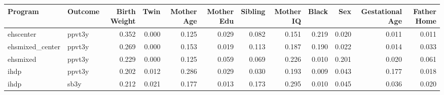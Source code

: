 \begin{table}[ht]
\centering
\begin{tabular}{llrrrrrrrrrr}
  \hline
Program & Outcome & Birth Weight & Twin & Mother Age & Mother Edu & Sibling & Mother IQ & Black & Sex & Gestational Age & Father Home \\ 
  \hline
ehscenter & ppvt3y & 0.352 & 0.000 & 0.125 & 0.029 & 0.082 & 0.151 & 0.219 & 0.020 & 0.011 & 0.011 \\ 
  ehsmixed\_center & ppvt3y & 0.269 & 0.000 & 0.153 & 0.019 & 0.113 & 0.187 & 0.190 & 0.022 & 0.014 & 0.033 \\ 
  ehsmixed & ppvt3y & 0.229 & 0.000 & 0.125 & 0.059 & 0.069 & 0.226 & 0.010 & 0.201 & 0.020 & 0.061 \\ 
  ihdp & ppvt3y & 0.202 & 0.012 & 0.286 & 0.029 & 0.030 & 0.193 & 0.009 & 0.043 & 0.177 & 0.018 \\ 
  ihdp & sb3y & 0.212 & 0.021 & 0.177 & 0.013 & 0.173 & 0.295 & 0.010 & 0.045 & 0.036 & 0.020 \\ 
   \hline
\end{tabular}
\end{table}
